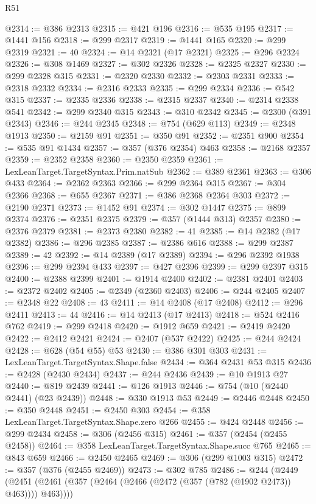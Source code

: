 \begin{lexlean}{R51}
\begin{coremodule}
@2314 := @386 @2313
@2315 := @421 @196
@2316 := @535 @195
@2317 := @1441 @156
@2318 := @299 @2317
@2319 := @1441 @165
@2320 := @299 @2319
@2321 := 40
@2324 := @14 @2321 (@17 @2321)
@2325 := @296 @2324
@2326 := @308 @1469
@2327 := @302 @2326
@2328 := @2325 @2327
@2330 := @299 @2328 @315
@2331 := @2320 @2330
@2332 := @2303 @2331
@2333 := @2318 @2332
@2334 := @2316 @2333
@2335 := @299 @2334
@2336 := @542 @315
@2337 := @2335 @2336
@2338 := @2315 @2337
@2340 := @2314 @2338 @541
@2342 := @299 @2340 @315
@2343 := @310 @2342
@2345 := @2300 (@391 @2343)
@2346 := @244 @2345
@2348 := @754 (@629 @113)
@2349 := @2348 @1913
@2350 := @2159 @91
@2351 := @350 @91
@2352 := @2351 @900
@2354 := @535 @91 @1434
@2357 := @357 (@376 @2354) @463
@2358 := @2168 @2357
@2359 := @2352 @2358
@2360 := @2350 @2359
@2361 := LexLeanTarget.TargetSyntax.Prim.natSub
@2362 := @389 @2361
@2363 := @306 @433
@2364 := @2362 @2363
@2366 := @299 @2364 @315
@2367 := @304 @2366
@2368 := @655 @2367
@2371 := @386 @2368 @2364 @303
@2372 := @2190 @2371
@2373 := @1452 @91
@2374 := @302 @1447
@2375 := @899 @2374
@2376 := @2351 @2375
@2379 := @357 (@1444 @313) @2357
@2380 := @2376 @2379
@2381 := @2373 @2380
@2382 := 41
@2385 := @14 @2382 (@17 @2382)
@2386 := @296 @2385
@2387 := @2386 @616
@2388 := @299 @2387
@2389 := 42
@2392 := @14 @2389 (@17 @2389)
@2394 := @296 @2392 @1938
@2396 := @299 @2394 @433
@2397 := @427 @2396
@2399 := @299 @2397 @315
@2400 := @2388 @2399
@2401 := @1914 @2400
@2402 := @2381 @2401
@2403 := @2372 @2402
@2405 := @2349 (@2360 @2403)
@2406 := @244 @2405
@2407 := @2348 @22
@2408 := 43
@2411 := @14 @2408 (@17 @2408)
@2412 := @296 @2411
@2413 := 44
@2416 := @14 @2413 (@17 @2413)
@2418 := @524 @2416 @762
@2419 := @299 @2418
@2420 := @1912 @659
@2421 := @2419 @2420
@2422 := @2412 @2421
@2424 := @2407 (@537 @2422)
@2425 := @244 @2424
@2428 := @628 (@54 @55) @53
@2430 := @386 @301 @303
@2431 := LexLeanTarget.TargetSyntax.Shape.false
@2434 := @364 @2431 @53 @315
@2436 := @2428 (@2430 @2434)
@2437 := @244 @2436
@2439 := @10 @1913 @27
@2440 := @819 @2439
@2441 := @126 @1913
@2446 := @754 (@10 (@2440 @2441) (@23 @2439))
@2448 := @330 @1913 @53
@2449 := @2446 @2448
@2450 := @350 @2448
@2451 := @2450 @303
@2454 := @358 LexLeanTarget.TargetSyntax.Shape.zero @266
@2455 := @424 @2448
@2456 := @299 @2434
@2458 := @306 (@2456 @315)
@2461 := @357 (@2454 (@2455 @2458))
@2464 := @358 LexLeanTarget.TargetSyntax.Shape.succ @765
@2465 := @843 @659
@2466 := @2450 @2465
@2469 := @306 (@299 @1003 @315)
@2472 := @357 (@376 (@2455 @2469))
@2473 := @302 @785
@2486 := @244
    (@2449 (@2451 (@2461 (@357 (@2464 (@2466 (@2472 (@357 (@782 (@1902 @2473)) @463)))) @463))))

\end{coremodule}
\end{lexlean}
